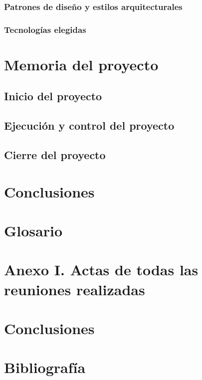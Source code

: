 \documentclass{article}
\begin{document}
\subsubsection*{Patrones de diseño y estilos arquitecturales}


\subsubsection*{Tecnologías elegidas}











\section{Memoria del proyecto}

\subsection{Inicio del proyecto}

\subsection{Ejecución y control del proyecto}

\subsection{Cierre del proyecto}

\section{Conclusiones}

\section*{Glosario}

\section*{Anexo I. Actas de todas las reuniones realizadas}

\section{Conclusiones}

\section{Bibliografía}
\end{document}
